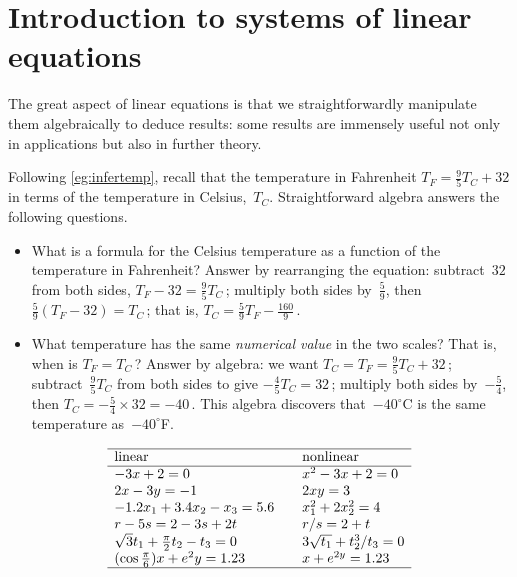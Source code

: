 
\section{Introduction to systems of linear equations}
\label{sec:isle}
{}

The great aspect of linear equations is that we straightforwardly manipulate them algebraically to deduce results: some results are immensely useful not only in applications but also in further theory.

\begin{example} \label{eg:tempman}
Following \cref{eg:infertemp}, recall that the temperature in Fahrenheit \(T_F=\frac95T_C+32\) in terms of the temperature in Celsius,~\(T_C\).
Straightforward algebra answers the following questions.
\begin{itemize}
\item What is a formula for the Celsius temperature as a function of the temperature in Fahrenheit?  
Answer by rearranging the equation: subtract~\(32\) from both sides, \(T_F-32=\frac95T_C\)\,;  multiply both sides by~\(\frac59\), then \(\frac59(T_F-32)=T_C\)\,; that is, \(T_C=\frac59T_F-\frac{160}9\)\,.

\item What temperature has the same \emph{numerical value} in the two scales?  
That is, when is \(T_F=T_C\)\,?  
Answer by algebra: we want \(T_C=T_F=\frac95T_C+32\)\,; subtract~\(\frac95T_C\) from both sides to give \(-\frac45T_C=32\)\,; multiply both sides by~\(-\frac54\), then \(T_C=-\frac54\times32=-40\)\,. 
This algebra discovers that~\(-40^\circ\)C is the same temperature as~\(-40^\circ\)F.
\aqed
\end{itemize}
\end{example}


\begin{table}[btp]
\caption{Examples of linear equations, and equations that are not linear (called s).}
\label{tbl:linnonlin}
\begin{equation*}
\begin{array}{l@{\qquad}l}\hline
\text{linear}&\text{nonlinear}\\\hline
-3x+2=0 & x^2-3x+2=0 \\
2x-3y=-1 & 2xy=3\\
-1.2x_1+3.4x_2-x_3=5.6 & x_1^2+2x_2^2=4 \\
r-5s=2-3s+2t & r/s=2+t \\
\sqrt3t_1+\frac\pi2t_2-t_3=0 & 3\sqrt{t_1}+t_2^3/t_3=0\\
(\cos\frac\pi6)x+e^2y=1.23 & x+e^{2y}=1.23\\
\hline
\end{array}
\end{equation*}
\end{table}


